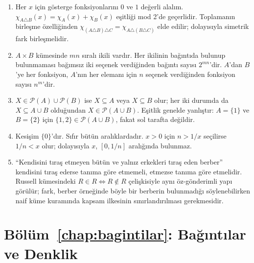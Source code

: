 \begin{enumerate}
\item Her $x$ için gösterge fonksiyonlarını $0$ ve $1$ değerli alalım. $\chi_{A\triangle B}(x)=\chi_A(x)+\chi_B(x)$ eşitliği mod 2'de geçerlidir. Toplamanın birleşme özelliğinden $\chi_{(A\triangle B)\triangle C}=\chi_{A\triangle(B\triangle C)}$ elde edilir; dolayısıyla simetrik fark birleşmelidir.

\item $A\times B$ kümesinde $mn$ sıralı ikili vardır. Her ikilinin bağıntıda bulunup bulunmaması bağımsız iki seçenek verdiğinden bağıntı sayısı $2^{mn}$'dir. $A$'dan $B$'ye her fonksiyon, $A$'nın her elemanı için $n$ seçenek verdiğinden fonksiyon sayısı $n^m$'dir.

\item $X\in\mathcal P(A)\cup\mathcal P(B)$ ise $X\subseteq A$ veya $X\subseteq B$ olur; her iki durumda da $X\subseteq A\cup B$ olduğundan $X\in\mathcal P(A\cup B)$. Eşitlik genelde yanlıştır: $A=\{1\}$ ve $B=\{2\}$ için $\{1,2\}\in\mathcal P(A\cup B)$, fakat sol tarafta değildir.

\item Kesişim $\{0\}$'dır. Sıfır bütün aralıklardadır. $x>0$ için $n>1/x$ seçilirse $1/n<x$ olur; dolayısıyla $x$, $[0,1/n]$ aralığında bulunmaz.

\item ``Kendisini tıraş etmeyen bütün ve yalnız erkekleri tıraş eden berber'' kendisini tıraş ederse tanıma göre etmemeli, etmezse tanıma göre etmelidir. Russell kümesindeki $R\in R\Longleftrightarrow R\notin R$ çelişkisiyle aynı öz-gönderimli yapı görülür; fark, berber örneğinde böyle bir berberin bulunmadığı söylenebilirken naif küme kuramında kapsam ilkesinin sınırlandırılması gerekmesidir.
\end{enumerate}

\section{Bölüm~\ref{chap:bagintilar}: Bağıntılar ve Denklik}

